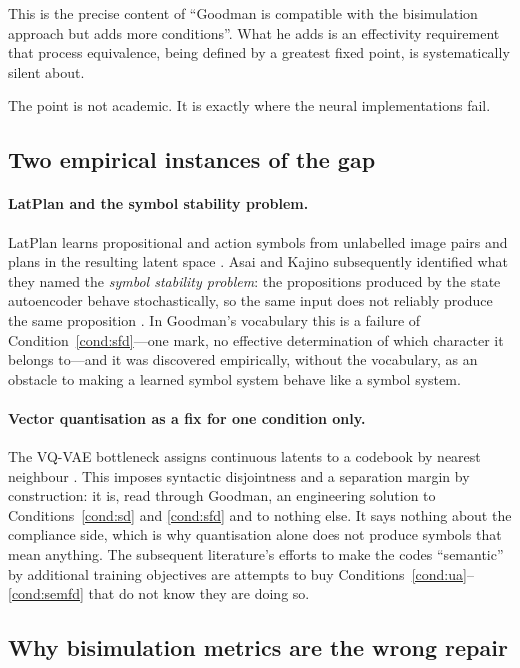 \documentclass[11pt,a4paper]{article}
\theoremstyle{definition}
\theoremstyle{plain}
\theoremstyle{remark}
\begin{document}
\noindent This is the precise content of ``Goodman is compatible with the bisimulation
approach but adds more conditions''. What he adds is an effectivity requirement that
process equivalence, being defined by a greatest fixed point, is systematically silent
about.

The point is not academic. It is exactly where the neural implementations fail.

\subsection{Two empirical instances of the gap}
\label{sec:instances}

\paragraph{LatPlan and the symbol stability problem.} LatPlan learns propositional and
action symbols from unlabelled image pairs and plans in the resulting latent space
\cite{asai2018}. Asai and Kajino subsequently identified what they named the
\emph{symbol stability problem}: the propositions produced by the state autoencoder behave
stochastically, so the same input does not reliably produce the same proposition
\cite{asai2019}. In Goodman's vocabulary this is a failure of
Condition~\ref{cond:sfd}---one mark, no effective determination of which character it
belongs to---and it was discovered empirically, without the vocabulary, as an obstacle to
making a learned symbol system behave like a symbol system.

\paragraph{Vector quantisation as a fix for one condition only.} The VQ-VAE bottleneck
assigns continuous latents to a codebook by nearest neighbour \cite{oord2017}. This
imposes syntactic disjointness and a separation margin by construction: it is, read
through Goodman, an engineering solution to Conditions~\ref{cond:sd} and \ref{cond:sfd}
and to nothing else. It says nothing about the compliance side, which is why quantisation
alone does not produce symbols that mean anything. The subsequent literature's efforts to
make the codes ``semantic'' by additional training objectives are attempts to buy
Conditions~\ref{cond:ua}--\ref{cond:semfd} that do not know they are doing so.

\subsection{Why bisimulation metrics are the wrong repair}
\end{document}

